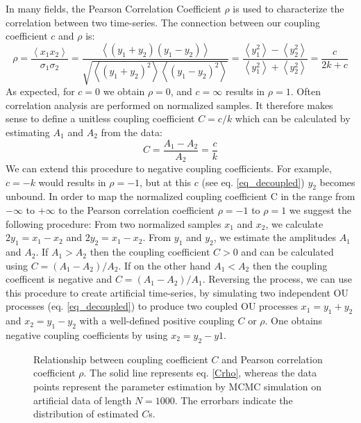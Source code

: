 \documentclass[%
 reprint,
 amsmath,amssymb,
 aps,
]{revtex4-1}
\begin{document}
In many fields, the Pearson Correlation Coefficient $\rho$ is used to characterize the correlation between two time-series.  The connection between our coupling coefficient $c$ and $\rho$ is:
\begin{equation}
	\rho = \frac{\left<x_{1}x_{2}\right>}{\sigma_{1}\sigma_{2}} = \frac{\left<(y_{1}+y_{2})(y_{1}-y_{2})\right>}{\sqrt{\left<(y_{1}+y_{2})^{2}\right>\left<(y_{1}-y_{2})^{2}\right>}} = \frac{\left<y_{1}^{2}\right>-\left<y_{2}^{2}\right>}{\left<y_{1}^{2}\right>+\left<y_{2}^{2}\right>} = \frac{c}{2k+c}
\end{equation}
As expected, for $c=0$ we obtain $\rho=0$, and $c=\infty$ results in $\rho=1$. Often correlation analysis are performed on normalized samples.  It therefore makes sense to define a unitless coupling coefficient $C=c/k$  which can be calculated by estimating $A_1$ and $A_2$ from the data:
\begin{equation}\label{Crho}
	C = \frac{A_{1}-A_{2}}{A_{2}}=\frac{c}{k}
\end{equation}
We can extend this procedure to negative coupling coefficients.  For example, $c=-k$ would results in $\rho=-1$, but at this $c$ (see eq. \ref{eq_decoupled}) $y_2$ becomes unbound.  In order to map the normalized coupling coefficient C in the range from $-\infty$ to $+\infty$ to the Pearson correlation coefficient $\rho=-1$ to $\rho=1$ we suggest the following procedure:  From two normalized samples $x_1$ and $x_2$, we calculate $2y_{1}=x_{1}-x_{2}$ and $2y_{2}=x_{1}-x_{2}$.  From $y_1$ and $y_2$, we estimate the amplitudes $A_{1}$ and $A_{2}$.  If $A_{1}>A_{2}$ then the coupling coefficient $C>0$ and can be calculated using $C=(A_{1}-A_{2})/A_{2}$.  If on the other hand $A_{1}<A_{2}$ then the coupling coefficent is negative and $C=(A_{1}-A_{2})/A_{1}$.  Reversing the process, we can use this procedure to create artificial time-series, by simulating two independent OU processes (eq. \ref{eq_decoupled}) to produce two coupled OU processes $x_{1}=y_{1}+y_{2}$ and $x_{2}=y_{1}-y_{2}$ with a well-defined positive coupling $C$ or $\rho$.  One obtains negative coupling coefficients by using $x_{2}=y_{2}-y{1}$.

\begin{figure}[H]
\begin{center}
\caption{Relationship between coupling coefficient $C$ and Pearson correlation coefficient $\rho$.  The solid line represents eq. \ref{Crho}, whereas the data points represent the parameter estimation by MCMC simulation on artificial data of length $N=1000$.  The errorbars indicate the distribution of estimated $C$s.}\label{fig:corr}
\end{center}
\end{figure}
\end{document}
